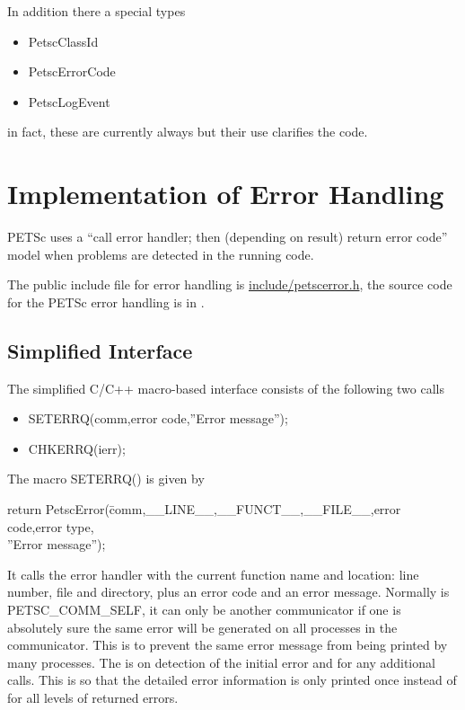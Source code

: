 \documentclass[twoside,12pt]{../sty/report_petsc}
\begin{document}
In addition there a special types
\begin{itemize}
  \item PetscClassId
  \item PetscErrorCode
  \item PetscLogEvent
\end{itemize}
in fact, these are currently always  but their use clarifies the code.

\section{Implementation of Error Handling}

PETSc  uses a ``call error handler; then (depending on result) return
error code'' model when problems are detected in the running code.

The public include file for error handling is
 \href{http://www.mcs.anl.gov/petsc/petsc-master/include/petscerror.h.html}{include/petscerror.h}, the
source code for the PETSc error handling is in
.

\subsection{Simplified Interface}

The simplified C/C++ macro-based interface consists of the following two calls
\begin{itemize}
\item SETERRQ(comm,error code,''Error message'');
\item CHKERRQ(ierr);
\end{itemize}

The macro SETERRQ() is given by
\begin{tabbing}
return PetscError(\=comm,\_\_LINE\_\_,\_\_FUNCT\_\_,\_\_FILE\_\_,error code,error type,\\
\> ''Error message'');
\end{tabbing}
It calls the error handler with the current function name and location: line number,
file and directory, plus an error code and an error message. Normally  is PETSC\_COMM\_SELF, it can only be another communicator if
one is absolutely sure the same error will be generated on all processes in the communicator. This is to prevent the same error message from
being printed by many processes. The  is  on detection of the initial error and  for any additional calls. This is so that
the detailed error information is only printed once instead of for all levels of returned errors.
\end{document}
